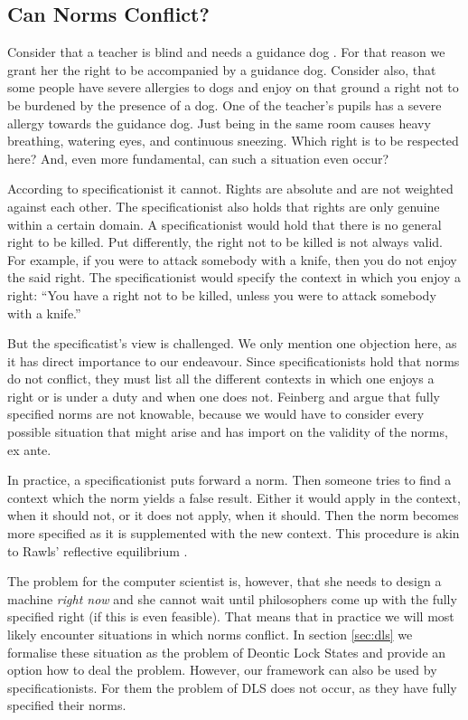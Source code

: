 \subsection{Can Norms Conflict?}

Consider that a teacher is blind and needs a guidance dog \citep{mclauhghlin_2016}. For that reason we grant her the right to be accompanied by a guidance dog. Consider also, that some people have severe allergies to dogs and enjoy on that ground a right not to be burdened by the presence of a dog. One of the teacher's pupils has a severe allergy towards the guidance dog. Just being in the same room causes heavy breathing, watering eyes, and continuous sneezing. Which right is to be respected here? And, even more fundamental, can such a situation even occur?

According to specificationist it cannot. Rights are absolute and are not weighted against each other. The specificationist also holds that rights are only genuine within a certain domain. A specificationist would hold that there is no general right to be killed. Put differently, the right not to be killed is not always valid. For example, if you were to attack somebody with a knife, then you do not enjoy the said right. The specificationist would specify the context in which you enjoy a right: ``You have a right not to be killed, unless you were to attack somebody with a knife.''

But the specificatist's view is challenged. We only mention one objection here, as it has direct importance to our endeavour. Since specificationists hold that norms do not conflict, they must list all the different contexts in which one enjoys a right or is under a duty and when one does not. Feinberg \citet[p.~221-251]{feinberg2014rights} and \citet[p.~82-104]{thomson1990realm} argue that fully specified norms are not knowable, because we would have to consider every possible situation that might arise and has import on the validity of the norms, ex ante. 

In practice, a specificationist puts forward a norm. Then someone tries to find a context which the norm yields a false result. Either it would apply in the context, when it should not, or it does not apply, when it should. Then the norm becomes more specified as it is supplemented with the new context. This procedure is akin to Rawls' reflective equilibrium \citep{rawls1999justice,mcdermott2008analytic}. 

The problem for the computer scientist is, however, that she needs to design a machine \emph{right now} and she cannot wait until philosophers come up with the fully specified right (if this is even feasible). That means that in practice we will most likely encounter situations in which norms conflict. In section \ref{sec:dls} we formalise these situation as the problem of Deontic Lock States and provide an option how to deal the problem. However, our framework can also be used by specificationists. For them the problem of DLS does not occur, as they have fully specified their norms. 

